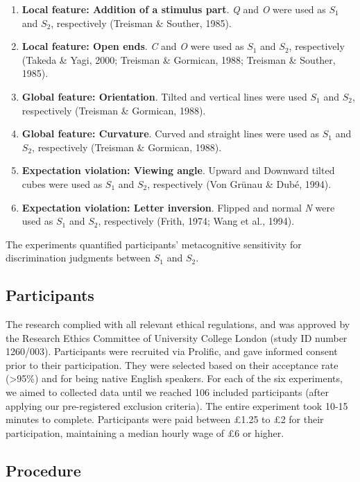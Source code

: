 \documentclass[12pt,twoside]{reedthesis}
\providecommand{\tightlist}{%
  \setlength{\itemsep}{0pt}\setlength{\parskip}{0pt}}
\begin{document}
\begin{enumerate}
\def\labelenumi{\arabic{enumi}.}
\tightlist
\item
  \textbf{Local feature: Addition of a stimulus part}. \emph{Q} and \emph{O} were used as \(S_1\) and \(S_2\), respectively (Treisman \& Souther, 1985).
\item
  \textbf{Local feature: Open ends}. \emph{C} and \emph{O} were used as \(S_1\) and \(S_2\), respectively (Takeda \& Yagi, 2000; Treisman \& Gormican, 1988; Treisman \& Souther, 1985).
\item
  \textbf{Global feature: Orientation}. Tilted and vertical lines were used \(S_1\) and \(S_2\), respectively (Treisman \& Gormican, 1988).
\item
  \textbf{Global feature: Curvature}. Curved and straight lines were used as \(S_1\) and \(S_2\), respectively (Treisman \& Gormican, 1988).
\item
  \textbf{Expectation violation: Viewing angle}. Upward and Downward tilted cubes were used as \(S_1\) and \(S_2\), respectively (Von Grünau \& Dubé, 1994).
\item
  \textbf{Expectation violation: Letter inversion}. Flipped and normal \emph{N} were used as \(S_1\) and \(S_2\), respectively (Frith, 1974; Wang et al., 1994).
\end{enumerate}
The experiments quantified participants' metacognitive sensitivity for discrimination judgments between \(S_1\) and \(S_2\).

\hypertarget{participants-8}{%
\subsection{Participants}\label{participants-8}}

The research complied with all relevant ethical regulations, and was approved by the Research Ethics Committee of University College London (study ID number 1260/003). Participants were recruited via Prolific, and gave informed consent prior to their participation. They were selected based on their acceptance rate (\textgreater95\%) and for being native English speakers. For each of the six experiments, we aimed to collected data until we reached 106 included participants (after applying our pre-registered exclusion criteria). The entire experiment took 10-15 minutes to complete. Participants were paid between £1.25 to £2 for their participation, maintaining a median hourly wage of £6 or higher.

\hypertarget{procedure-4}{%
\subsection{Procedure}\label{procedure-4}}
\end{document}
